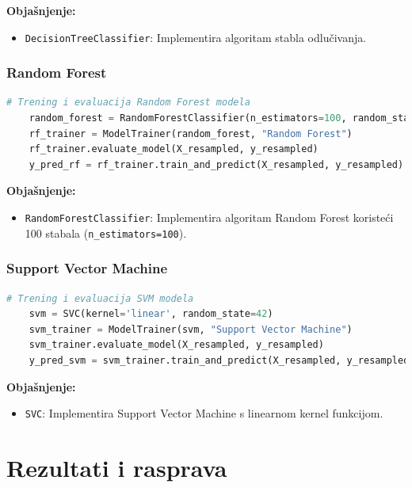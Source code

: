 \documentclass[zavrsnirad]{fer}
\begin{document}
\noindent \textbf{Objašnjenje:}
\begin{itemize}
	\item \texttt{DecisionTreeClassifier}: Implementira algoritam stabla odlučivanja.
\end{itemize}

\subsection{Random Forest}

\begin{lstlisting}[language=Python, caption={Trening i evaluacija Random Forest modela}]
	# Trening i evaluacija Random Forest modela
	random_forest = RandomForestClassifier(n_estimators=100, random_state=42)
	rf_trainer = ModelTrainer(random_forest, "Random Forest")
	rf_trainer.evaluate_model(X_resampled, y_resampled)
	y_pred_rf = rf_trainer.train_and_predict(X_resampled, y_resampled)
\end{lstlisting}

\noindent \textbf{Objašnjenje:}
\begin{itemize}
	\item \texttt{RandomForestClassifier}: Implementira algoritam Random Forest koristeći 100 stabala (\texttt{n\_estimators=100}).
\end{itemize}

\subsection{Support Vector Machine}

\begin{lstlisting}[language=Python, caption={Trening i evaluacija SVM modela}]
	# Trening i evaluacija SVM modela
	svm = SVC(kernel='linear', random_state=42)
	svm_trainer = ModelTrainer(svm, "Support Vector Machine")
	svm_trainer.evaluate_model(X_resampled, y_resampled)
	y_pred_svm = svm_trainer.train_and_predict(X_resampled, y_resampled)
\end{lstlisting}

\noindent \textbf{Objašnjenje:}
\begin{itemize}
	\item \texttt{SVC}: Implementira Support Vector Machine s linearnom kernel funkcijom.
\end{itemize}


\chapter{Rezultati i rasprava}
\label{pog:rezultati_i_rasprava}
\end{document}
